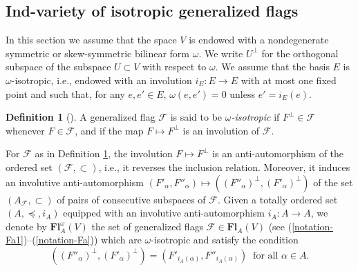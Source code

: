 \documentclass[12pt]{amsart}
\theoremstyle{definition}
\newtheorem{definition}{Definition}
\begin{document}
\subsection{Ind-variety of isotropic generalized flags}

\label{section-3-2}

In this section we assume that the space $V$ is endowed with a nondegenerate symmetric or skew-symmetric bilinear form $\omega$.
We write $U^\perp$ for the orthogonal subspace of the subspace $U\subset V$ with respect to $\omega$.
We assume that the basis $E$ is $\omega$-isotropic, i.e., endowed with an involution $i_E:E\to E$ with at most one fixed point and such that, for any $e,e'\in E$, $\omega(e,e')=0$ unless $e'=i_E(e)$.

\begin{definition}[\cite{DP1,DP}]
\label{definition-4}
A generalized flag $\mathcal{F}$ is said to be {\em $\omega$-isotropic} if  $F^\perp\in\mathcal{F}$ whenever $F\in\mathcal{F}$, and if the map $F\mapsto F^\perp$ is an involution of $\mathcal{F}$.
\end{definition}

For $\mathcal{F}$ as in Definition \ref{definition-4},
the involution $F\mapsto F^\perp$ is an anti-automorphism of the ordered set $(\mathcal{F},\subset)$, i.e., it reverses the inclusion relation. Moreover, it induces an involutive anti-automorphism $(F'_\alpha,F''_\alpha)\mapsto ((F''_\alpha)^\perp,(F'_\alpha)^\perp)$ of the set $(A_\mathcal{F},\subset)$ of pairs of consecutive subspaces of $\mathcal{F}$.
Given a totally ordered set $(A,\preceq,i_A)$ equipped with an involutive anti-automorphism $i_A:A\to A$, we denote by $\mathbf{Fl}_A^\omega(V)$ the set of generalized flags $\mathcal{F}\in\mathbf{Fl}_A(V)$ (see (\ref{notation-Fa1})--(\ref{notation-Fa}))
which are $\omega$-isotropic and satisfy the condition
\begin{equation}
\label{notation-Fa3}
((F''_\alpha)^\perp,(F'_\alpha)^\perp)=(F'_{i_A(\alpha)},F''_{i_A(\alpha)})\ \mbox{ for all $\alpha\in A$}.
\end{equation}
\end{document}
